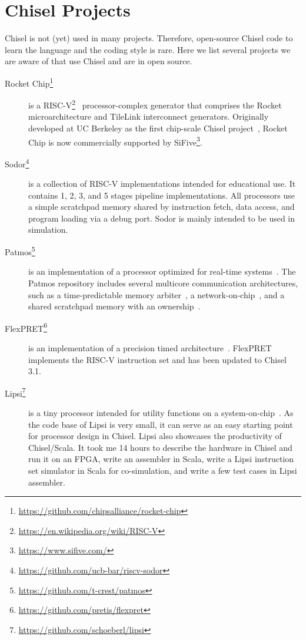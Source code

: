 \documentclass[%
    10pt,
    headinclude, footexclude,
    openright, %
    notitlepage,
    cleardoubleempty,
    headsepline,
    pointlessnumbers,
    bibtotoc, idxtotoc,
    ]{scrbook}
\newcommand{\myref}[2]{\href{#1}{#2}}
\renewcommand{\myref}[2]{{#2}{\footnote{\url{#1}}}}
\begin{document}
\chapter{Chisel Projects}


Chisel is not (yet) used in many projects. Therefore, open-source Chisel code
to learn the language and the coding style is rare. Here we list several projects
we are aware of that use Chisel and are in open source.

\begin{description}

\item[\myref{https://github.com/chipsalliance/rocket-chip}{Rocket Chip}]
is a \myref{https://en.wikipedia.org/wiki/RISC-V}{RISC-V}~\cite{risc-v}
processor-complex generator that comprises the Rocket
microarchitecture and TileLink interconnect generators.  Originally developed
at UC Berkeley as the first chip-scale Chisel project~\cite{rocket:techrep}, Rocket Chip is now
commercially supported by \myref{https://www.sifive.com/}{SiFive}.

\item[\myref{https://github.com/ucb-bar/riscv-sodor}{Sodor}] is a collection of RISC-V
implementations intended for educational use. It contains 1, 2, 3, and 5 stages pipeline
implementations. All processors use a simple scratchpad memory shared by instruction
fetch, data access, and program loading via a debug port. Sodor is mainly intended to
be used in simulation.

\item[\myref{https://github.com/t-crest/patmos}{Patmos}] is an implementation of a
processor optimized for real-time systems~\cite{patmos:rts2018}. The Patmos repository
includes several multicore communication architectures, such as a time-predictable memory
arbiter~\cite{t-crest:memnoc}, a network-on-chip~\cite{s4nocni:arcs2019}, and
a shared scratchpad memory with an ownership~\cite{t-crest:ownspm}.

\item[\myref{https://github.com/pretis/flexpret}{FlexPRET}] is an implementation of a
precision timed architecture~\cite{Zimmer:EECS-2015-181}. FlexPRET implements
the RISC-V instruction set and has been updated to Chisel 3.1.

\item[\myref{https://github.com/schoeberl/lipsi}{Lipsi}] is a tiny processor intended
for utility functions on a system-on-chip~\cite{lipsi:arcs2018}. As the code base of
Lipsi is very small, it can serve as an easy starting point for processor design in Chisel.
Lipsi also showcases the productivity of Chisel/Scala. It took me 14 hours to describe the
hardware in Chisel and run it on an FPGA, write an assembler in Scala, write a
Lipsi instruction set simulator in Scala for co-simulation, and write a few test cases
in Lipsi assembler.


\end{description}
\end{document}
